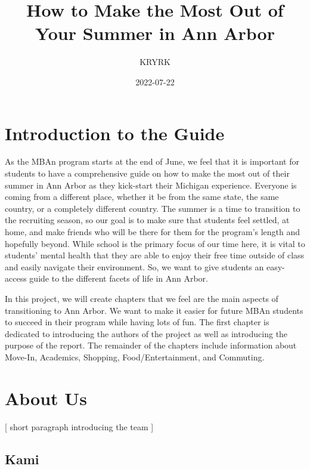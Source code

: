 \documentclass[
]{book}
\title{How to Make the Most Out of Your Summer in Ann Arbor}
\author{KRYRK}
\date{2022-07-22}
\begin{document}
\maketitle

{
\setcounter{tocdepth}{1}
\tableofcontents
}
\hypertarget{introduction-to-the-guide}{%
\chapter*{Introduction to the Guide}\label{introduction-to-the-guide}}

As the MBAn program starts at the end of June, we feel that it is important for students to have a comprehensive guide on how to make the most out of their summer in Ann Arbor as they kick-start their Michigan experience. Everyone is coming from a different place, whether it be from the same state, the same country, or a completely different country. The summer is a time to transition to the recruiting season, so our goal is to make sure that students feel settled, at home, and make friends who will be there for them for the program's length and hopefully beyond. While school is the primary focus of our time here, it is vital to students' mental health that they are able to enjoy their free time outside of class and easily navigate their environment. So, we want to give students an easy-access guide to the different facets of life in Ann Arbor.

In this project, we will create chapters that we feel are the main aspects of transitioning to Ann Arbor. We want to make it easier for future MBAn students to succeed in their program while having lots of fun. The first chapter is dedicated to introducing the authors of the project as well as introducing the purpose of the report. The remainder of the chapters include information about Move-In, Academics, Shopping, Food/Entertainment, and Commuting.

\hypertarget{about-us}{%
\chapter*{About Us}\label{about-us}}

{[} short paragraph introducing the team {]}

\hypertarget{kami}{%
\section{Kami}\label{kami}}
\end{document}
